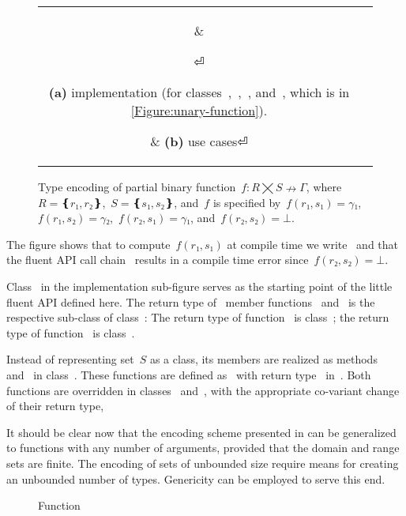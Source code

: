 \begin{figure}[hbt]
  \caption{\label{Figure:simple-binary}%
    Type encoding of partial binary function~$f:R⨉S↛Γ$,
    where~$R=❴r₁,r₂❵$,~$S=❴s₁,s₂❵$, and~$f$
  is specified by~$f(r₁,s₁)=γ₁$,~$f(r₁,s₂)=γ₂$,~$f(r₂,s₁)=γ₁$, and~$f(r₂, s₂)=⊥$.}
    \begin{tabular}{cc}
    \hspace{-3.5ex}
      \parbox[c]{0.57\linewidth}{%
      }
          &
      \hspace{-16ex}
      \parbox[c]{51ex}{}
⏎
\parbox{0.57\linewidth}
{\textbf{(a)} implementation (for classes~,~,~, and~, 
which is in \cref{Figure:unary-function}).}
& \hspace{-5ex}\textbf{(b)} use cases⏎
    \end{tabular}
  \end{figure}

The figure shows that to compute~$f(r₁,s₁)$ at compile time we write~
and that the fluent API call chain~ results in
  a compile time error since~$f(r₂, s₂)=⊥$.

Class~ in the implementation sub-figure serves as
  the starting point of the little fluent API defined here.
The return type of~ member functions~ and~
  is the respective sub-class of class~:
The return type of function~ is class~;
  the return type of function~ is class~.

Instead of representing set~$S$ as a class,
  its members are realized as methods~ and~ in class~.
These functions are defined as~ with return type~
  in~.
Both functions are overridden in classes~ and~,
   with the appropriate co-variant change of their return type,

It should be clear now that the encoding scheme presented
  in  can be generalized to functions
  with any number of arguments, provided that the domain and range sets are finite.
The encoding of sets of unbounded size require means for creating an unbounded
 number of types.
Genericity can be employed to serve this end. 

\begin{wrapfigure}[4]{r}{31ex}
  \caption{\label{Figure:id}%
  Function   
  }
\end{wrapfigure}

